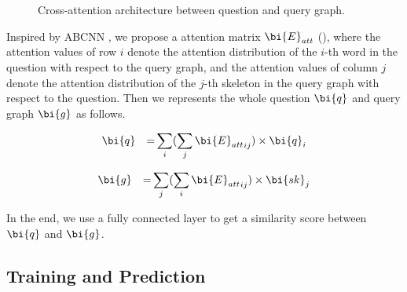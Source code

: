 \begin{figure*}
	\centering
	\caption{Cross-attention architecture between question and query graph.}
	\label{fig:attention}
\end{figure*}

Inspired by ABCNN \cite{yin2015abcnn}, we propose a attention matrix $\bi{E}_{att}$  (), where the attention values of row $i$ denote the attention distribution of the $i$-th word in the question with respect to the query graph, and the attention values of column $j$ denote the attention distribution of the $j$-th skeleton in the query graph with respect to the question. Then we represents the whole question $\bi{q}$ and query graph $\bi{g}$ as follows. 




\begin{equation}
\label{eqn:att-q}
\begin{aligned}
& \bi{q} & = & \sum_{i}(\sum_{j}{\bi{E}_{att}}_{ij}) \times \bi{q}_i\\
\end{aligned}
\end{equation}
\noindent

\begin{equation}
\label{eqn:att-g}
\begin{aligned}
& \bi{g} & = & \sum_{j}(\sum_{i}{\bi{E}_{att}}_{ij}) \times \bi{sk}_j\\
\end{aligned}
\end{equation}
\noindent

In the end, we use a fully connected layer to get a similarity score between $\bi{q}$ and $\bi{g}$.



\subsection{Training and Prediction}
\label{sec:training}






